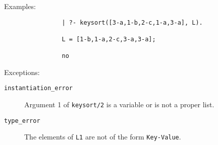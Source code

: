 \begin{description}
    Examples:
    {\footnotesize
     \begin{verbatim}
                | ?- keysort([3-a,1-b,2-c,1-a,3-a], L).

                L = [1-b,1-a,2-c,3-a,3-a];

                no
     \end{verbatim}}
    Exceptions:
    \begin{description}
    \item[{\tt instantiation\_error}]
	Argument 1 of {\tt keysort/2} is a variable or is not a proper list.
    \item[{\tt type\_error}]
	The elements of {\tt L1} are not of the form \verb'Key-Value'.
    \end{description}
\end{description}




